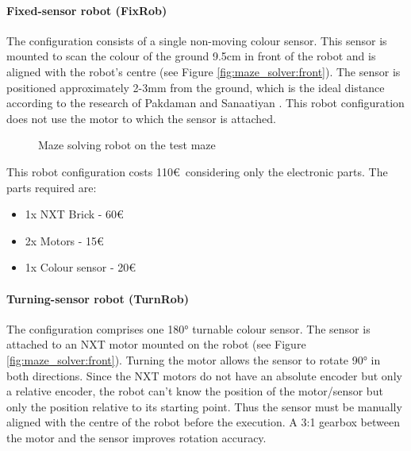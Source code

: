 \paragraph{Fixed-sensor robot (FixRob)}\label{sec:fixrob}

The \FixRob configuration consists of a single non-moving colour sensor. This sensor is mounted to scan the colour of the ground 9.5cm in front of the robot and is aligned with the robot's centre (see Figure \ref{fig:maze_solver:front}). The sensor is positioned approximately 2-3mm from the ground, which is the ideal distance according to the research of Pakdaman and Sanaatiyan \cite{pakdaman}.
This robot configuration does not use the motor to which the sensor is attached.

\begin{figure}[h]
    \centering
    \hfill
    \caption{Maze solving robot on the test maze}
    \label{fig:maze_solver}
\end{figure}

This robot configuration costs 110\euro\ considering only the electronic parts. The parts required are:
\begin{itemize}
    \item 1x NXT Brick - 60\euro
    \item 2x Motors - 15\euro
    \item 1x Colour sensor - 20\euro
\end{itemize}

\paragraph{Turning-sensor robot (TurnRob)}\label{sec:turnrob}

The \TurnRob configuration comprises one 180° turnable colour sensor. The sensor is attached to an NXT motor mounted on the robot (see Figure \ref{fig:maze_solver:front}). Turning the motor allows the sensor to rotate 90° in both directions. Since the NXT motors do not have an absolute encoder but only a relative encoder, the robot can't know the position of the motor/sensor but only the position relative to its starting point. Thus the sensor must be manually aligned with the centre of the robot before the execution. A 3:1 gearbox between the motor and the sensor improves rotation accuracy.

